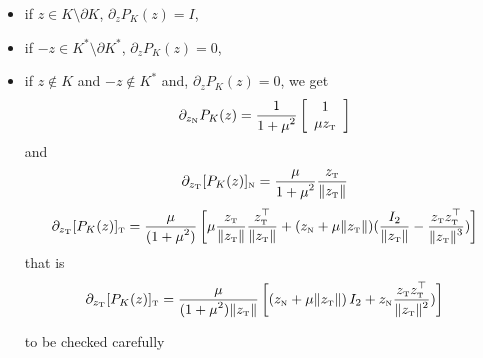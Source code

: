 \begin{itemize}
\item if $z\in K\setminus \partial K$, $\partial_z P_K(z) =I$,
\item if $-z \in K^*\setminus \partial K^*$, $\partial_z P_K(z) =0$,
\item if $z \notin K$ and $-z \notin K^*$ and, $\partial_z P_K(z) =0$, we get
\begin{equation}
  \label{eq:sub-proj_n}
  \partial_{z_\n} P_{K}(z) =
  \Frac 1 {1+\mu^2}
  \left[
    \begin{array}{c}
      1 \\
      \mu z_\t
    \end{array}\right] 
\end{equation}
and
\begin{equation}
  \label{eq:sub-proj_t1}
  \partial_{z_\t} [P_{K}(z)]_\n =
  \Frac \mu {1+\mu^2} \Frac {z_\t} {\|z_\t\|}
\end{equation}
\begin{equation}
  \label{eq:sub-proj_2}
  \partial_{z_\t} [P_{K}(z)]_\t =
  \Frac {\mu} {(1+\mu^2)} \left[\mu \Frac {z_\t} {\|z_\t\|} \Frac {z^\top_\t} {\|z_\t\|}+ (z_\n + \mu \|z_\t\|) (\Frac{I_2}{\|z_\t\|} - \Frac{z_\t z_\t^\top}{\|z_\t\|^3} )\right]
\end{equation}
that is
\begin{equation}
  \label{eq:sub-proj_2}
  \partial_{z_\t} [P_{K}(z)]_\t =
  \Frac {\mu} {(1+\mu^2)\|z_\t\|} \left[ (z_\n + \mu \|z_\t\|) \,I_2   +  z_\n  \Frac{z_\t z_\t^\top}{\|z_\t\|^2} )\right]
\end{equation}
\begin{ndrva}
  to be checked carefully
\end{ndrva}

\end{itemize}

